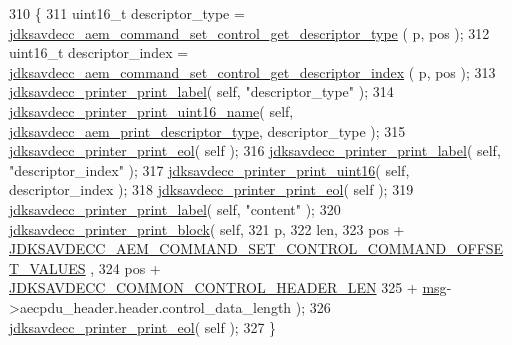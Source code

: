 \begin{DoxyCode}
310 \{
311     uint16\_t descriptor\_type = 
      \hyperlink{group__command__set__control_ga65732c036039042631d50df57dc332fe}{jdksavdecc\_aem\_command\_set\_control\_get\_descriptor\_type}
      ( p, pos );
312     uint16\_t descriptor\_index = 
      \hyperlink{group__command__set__control_gafc0eea5691e5fc876385e663f57e2b40}{jdksavdecc\_aem\_command\_set\_control\_get\_descriptor\_index}
      ( p, pos );
313     \hyperlink{group__util_gaf7818b24143b3c7502926a425a242ff5}{jdksavdecc\_printer\_print\_label}( \textcolor{keyword}{self}, \textcolor{stringliteral}{"descriptor\_type"} );
314     \hyperlink{group__util_ga62486d864a66773d19bbbe23cebf346a}{jdksavdecc\_printer\_print\_uint16\_name}( \textcolor{keyword}{self}, 
      \hyperlink{group__aem__print_gabb4f27bdad61aeaf875d91f408b7199d}{jdksavdecc\_aem\_print\_descriptor\_type}, descriptor\_type );
315     \hyperlink{group__util_gacda56c9d3d24593a52c999682fa6e6e3}{jdksavdecc\_printer\_print\_eol}( \textcolor{keyword}{self} );
316     \hyperlink{group__util_gaf7818b24143b3c7502926a425a242ff5}{jdksavdecc\_printer\_print\_label}( \textcolor{keyword}{self}, \textcolor{stringliteral}{"descriptor\_index"} );
317     \hyperlink{group__util_ga9793e0ff8e7ed25d957282ee6b257ce2}{jdksavdecc\_printer\_print\_uint16}( \textcolor{keyword}{self}, descriptor\_index );
318     \hyperlink{group__util_gacda56c9d3d24593a52c999682fa6e6e3}{jdksavdecc\_printer\_print\_eol}( \textcolor{keyword}{self} );
319     \hyperlink{group__util_gaf7818b24143b3c7502926a425a242ff5}{jdksavdecc\_printer\_print\_label}( \textcolor{keyword}{self}, \textcolor{stringliteral}{"content"} );
320     \hyperlink{group__util_ga18d7b11e396f21996dedde77febcb22f}{jdksavdecc\_printer\_print\_block}( \textcolor{keyword}{self},
321                                     p,
322                                     len,
323                                     pos + 
      \hyperlink{group__command__set__control_gab7e5956990a2540d796470a682a5397e}{JDKSAVDECC\_AEM\_COMMAND\_SET\_CONTROL\_COMMAND\_OFFSET\_VALUES}
      ,
324                                     pos + \hyperlink{group__jdksavdecc__avtp__common__control__header_gaae84052886fb1bb42f3bc5f85b741dff}{JDKSAVDECC\_COMMON\_CONTROL\_HEADER\_LEN}
325                                     + \hyperlink{maap__log__linux_8c_a0c7e58a50354c4a4d6dad428d0e47029}{msg}->aecpdu\_header.header.control\_data\_length );
326     \hyperlink{group__util_gacda56c9d3d24593a52c999682fa6e6e3}{jdksavdecc\_printer\_print\_eol}( \textcolor{keyword}{self} );
327 \}
\end{DoxyCode}


